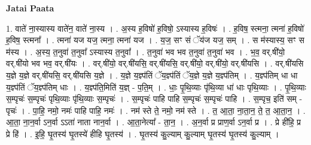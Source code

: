 \documentclass[17pt]{extarticle}
\begin{document}
\textbf{Jatai Paata} \newline

1. वाते॑ ना॒स्यास्य वाते॑न॒ वाते॑ ना॒स्य । . अ॒स्य ह॒विषो॑ ह॒विषो॒ ऽस्यास्य ह॒विषः॑ । . ह॒विष॒ स्त्मना॒ त्मना॑ ह॒विषो॑ ह॒विष॒ स्त्मना᳚ । . त्मना॑ यज यज॒ त्मना॒ त्मना॑ यज । . य॒ज॒ सꣳ सं ॅय॑ज यज॒ सम् । . स म॑स्यास्य॒ सꣳ स म॑स्य । . अ॒स्य॒ त॒नुवा॑ त॒नुवा᳚ ऽस्यास्य त॒नुवा᳚ । . त॒नुवा॑ भव भव त॒नुवा॑ त॒नुवा॑ भव । . भ॒व॒ वर्.षी॑यो॒ वर्.षी॑यो भव भव॒ वर्.षी॑यः । . वर्.षी॑यो॒ वर्.षी॑यसि॒ वर्.षी॑यसि॒ वर्.षी॑यो॒ वर्.षी॑यो॒ वर्.षी॑यसि । . वर्.षी॑यसि य॒ज्ञे य॒ज्ञे वर्.षी॑यसि॒ वर्.षी॑यसि य॒ज्ञे । . य॒ज्ञे य॒ज्ञ्प॑तिं ॅय॒ज्ञ्प॑तिं ॅय॒ज्ञे य॒ज्ञे य॒ज्ञ्प॑तिम् । . य॒ज्ञ्प॑तिम् धा धा य॒ज्ञ्प॑तिं ॅय॒ज्ञ्प॑तिम् धाः । . य॒ज्ञ्प॑ति॒मिति॑ य॒ज्ञ् - प॒ति॒म् । . धाः॒ पृ॒थि॒व्याः पृ॑थि॒व्या धा॑ धाः पृथि॒व्याः । . पृ॒थि॒व्याः स॒म्पृचः॑ स॒म्पृचः॑ पृथि॒व्याः पृ॑थि॒व्याः स॒म्पृचः॑ । . स॒म्पृचः॑ पाहि पाहि स॒म्पृचः॑ स॒म्पृचः॑ पाहि । . स॒म्पृच॒ इति॑ सम् - पृचः॑ । . पा॒हि॒ नमो॒ नमः॑ पाहि पाहि॒ नमः॑ । . नम॑ स्ते ते॒ नमो॒ नम॑ स्ते । . त॒ आ॒ता॒ ना॒ता॒न॒ ते॒ त॒ आ॒ता॒न॒ । . आ॒ता॒ ना॒न॒र्वा ऽन॒र्वा ऽऽता॑ नाता नान॒र्वा । . आ॒ता॒नेत्या᳚ - ता॒न॒ । . अ॒न॒र्वा प्र प्राण॒र्वा ऽन॒र्वा प्र । . प्रे ही॑हि॒ प्र प्रे हि॑ । . इ॒हि॒ घृ॒तस्य॑ घृ॒तस्ये॑ हीहि घृ॒तस्य॑ । . घृ॒तस्य॑ कु॒ल्याम् कु॒ल्याम् घृ॒तस्य॑ घृ॒तस्य॑ कु॒ल्याम् । \newline
\end{document}
